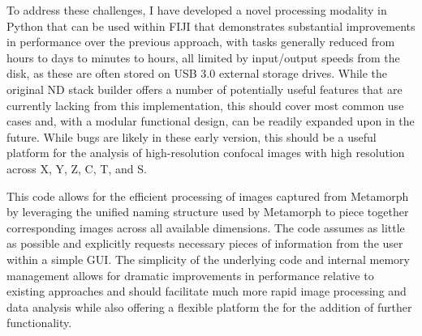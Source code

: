 To address these challenges, I have developed a novel processing modality in Python that can be used within FIJI that demonstrates substantial improvements in performance over the previous approach, with tasks generally reduced from hours to days to minutes to hours, all limited by input/output speeds from the disk, as these are often stored on USB 3.0 external storage drives. While the original ND stack builder offers a number of potentially useful features that are currently lacking from this implementation, this should cover most common use cases and, with a modular functional design, can be readily expanded upon in the future. While bugs are likely in these early version, this should be a useful platform for the analysis of high-resolution confocal images with high resolution across X, Y, Z, C, T, and S. 

\begin{code}
\caption{This code allows for the efficient processing of images captured from Metamorph by leveraging the unified naming structure used by Metamorph to piece together corresponding images across all available dimensions. The code assumes as little as possible and explicitly requests necessary pieces of information from the user within a simple GUI. The simplicity of the underlying code and internal memory management allows for dramatic improvements in performance relative to existing approaches and should facilitate much more rapid image processing and data analysis while also offering a flexible platform the for the addition of further functionality.}
\label{metamorpher}

\inputminted[breaklines,frame=single,fontsize=\small]{python}{source/metamorphTimeLapse.py}

\end{code}

